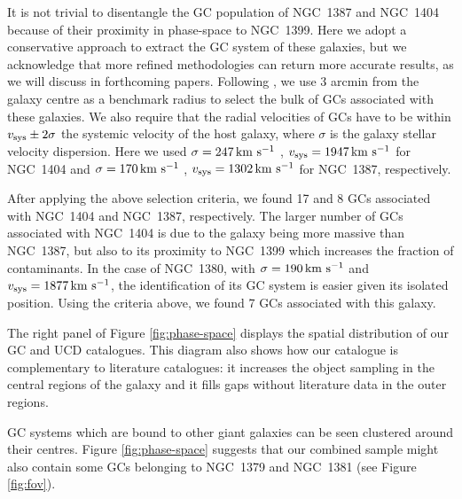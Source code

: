 \documentclass[usenatbib]{mnras}
\newcommand{\kms}{\mbox{\,km~s$^{-1}$}}
\begin{document}
It is not trivial to disentangle the GC population of NGC~1387 and NGC~1404 
because of their proximity in phase-space to NGC~1399. 
Here we adopt a conservative approach to extract the GC system of these 
galaxies, but we acknowledge that more refined methodologies can return more 
accurate results, as we will discuss in forthcoming papers.
Following \citet{Schuberth}, we use 3 arcmin from the galaxy 
centre as a benchmark radius to select the bulk of GCs associated with these 
galaxies. We also require that the radial velocities of GCs have to be within 
$v_{\rm sys} \pm 2\sigma$  the systemic velocity of the host galaxy, where 
$\sigma$ is the galaxy stellar velocity dispersion. Here we used $\sigma = 247 
\kms$  \citep{Vanderbeke11}, $v_{\rm sys} = 1947 \kms$ for NGC~1404 and $\sigma 
= 170 \kms$ \citep{Wegner03}, $v_{\rm sys} = 1302\kms $ for NGC~1387, 
respectively. 

After applying the above selection criteria, we found 17 and 8 
GCs associated with NGC~1404 and NGC~1387, respectively. 
The larger number of 
GCs associated with NGC~1404 is due to the galaxy being more massive than 
NGC~1387, but also to its proximity to NGC~1399 which increases the fraction of 
contaminants.
In the case of NGC~1380, with $\sigma = 190 \kms$  \citep{Vanderbeke11} and 
$v_{\rm sys} = 1877 \kms$, the identification of its GC system is easier given 
its isolated position. Using the criteria above, we found 7 GCs associated with 
this galaxy.

The right panel of Figure \ref{fig:phase-space} displays the spatial 
distribution of our GC and UCD catalogues. This diagram also shows how our 
catalogue is complementary to literature catalogues: it increases the object 
sampling in the central regions of the galaxy and it fills gaps without literature data in 
the outer regions. 

GC systems which are bound to other giant galaxies can be seen clustered around 
their centres. Figure \ref{fig:phase-space} suggests that our combined sample 
might also contain some GCs belonging to NGC~1379 and NGC~1381 (see Figure 
\ref{fig:fov}). 
\end{document}
